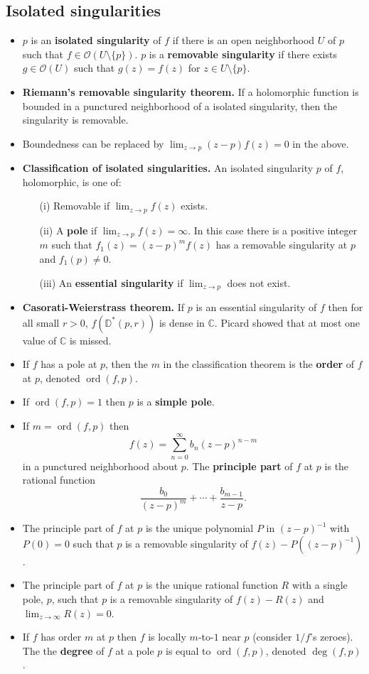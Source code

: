 \documentclass{article}
\DeclareMathOperator{\order}{ord}
\DeclareMathOperator{\degree}{deg}
\newenvironment{topic}[1]{%
{\subsection{#1}}%
\begin{itemize}%
}{%
\end{itemize}%
}
\newcommand{\theorem}[1]{\item {\bf #1.}}
\newcommand{\term}[1]{{\bf #1}}
\newcommand{\holo}[1]{\mathcal{O}(#1)}
\newcommand{\remark}{\item}
\newcommand{\pdisk}[2]{\mathbb{D}^\ast(#1, #2)}
\begin{document}
\begin{topic}{Isolated singularities}

\remark $p$ is an \term{isolated singularity} of $f$ if there is an open neighborhood $U$ of $p$ such that $f \in \holo{U \setminus \{p\}}$. $p$ is a \term{removable singularity} if there exists $g \in \holo{U}$ such that $g(z) = f(z)$ for $z \in U \setminus \{p\}$.

\theorem{Riemann's removable singularity theorem} If a holomorphic function is bounded in a punctured neighborhood of a isolated singularity, then the singularity is removable.

\remark Boundedness can be replaced by $\lim_{z \to p}(z - p)f(z) = 0$ in the above.

\theorem{Classification of isolated singularities} An isolated singularity $p$ of $f$, holomorphic, is one of: \begin{itemize}
\item[(i)] Removable if $\lim_{z \to p} f(z)$ exists.
\item[(ii)] A \term{pole} if $\lim_{z \to p} f(z) = \infty$. In this case there is a positive integer $m$ such that $f_1(z) = (z - p)^m f(z)$ has a removable singularity at $p$ and $f_1(p) \neq 0$.
\item[(iii)] An \term{essential singularity} if $\lim_{z \to p}$ does not exist.
\end{itemize}

\theorem{Casorati-Weierstrass theorem} If $p$ is an essential singularity of $f$ then for all small $r > 0$, $f(\pdisk{p}{r})$ is dense in $\mathbb{C}$. Picard showed that at most one value of $\mathbb{C}$ is missed.

\remark If $f$ has a pole at $p$, then the $m$ in the classification theorem is the \term{order} of $f$ at $p$, denoted $\order(f, p)$.

\remark If $\order(f, p) = 1$ then $p$ is a \term{simple pole}.

\remark If $m = \order(f, p)$ then $$f(z) = \sum_{n=0}^\infty b_n (z - p)^{n - m}$$ in a punctured neighborhood about $p$. The \term{principle part} of $f$ at $p$ is the rational function $$\dfrac{b_0}{(z - p)^m} + \cdots + \dfrac{b_{m-1}}{z-p}.$$

\remark The principle part of $f$ at $p$ is the unique polynomial $P$ in $(z-p)^{-1}$ with $P(0) = 0$ such that $p$ is a removable singularity of $f(z) - P((z-p)^{-1})$.

\remark The principle part of $f$ at $p$ is the unique rational function $R$ with a single pole, $p$, such that $p$ is a removable singularity of $f(z) - R(z)$ and $\lim_{z \to \infty} R(z) = 0$.

\remark If $f$ has order $m$ at $p$ then $f$ is locally $m$-to-$1$ near $p$ (consider $1/f$'s zeroes). The the \term{degree} of $f$ at a pole $p$ is equal to $\order(f, p)$, denoted $\degree(f, p)$.

\end{topic}
\end{document}

